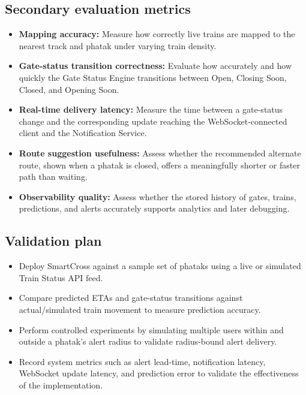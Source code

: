 \documentclass[11pt,a4paper]{article}
\begin{document}
\subsection{Secondary evaluation metrics}

\begin{itemize}
    \item \textbf{Mapping accuracy:} Measure how correctly live trains are mapped to the nearest track and phatak under varying train density.

    \item \textbf{Gate-status transition correctness:} Evaluate how accurately and how quickly the Gate Status Engine transitions between Open, Closing Soon, Closed, and Opening Soon.

    \item \textbf{Real-time delivery latency:} Measure the time between a gate-status change and the corresponding update reaching the WebSocket-connected client and the Notification Service.

    \item \textbf{Route suggestion usefulness:} Assess whether the recommended alternate route, shown when a phatak is closed, offers a meaningfully shorter or faster path than waiting.

    \item \textbf{Observability quality:} Assess whether the stored history of gates, trains, predictions, and alerts accurately supports analytics and later debugging.
\end{itemize}


\subsection{Validation plan}

\begin{itemize}
    \item Deploy SmartCross against a sample set of phataks using a live or simulated Train Status API feed.

    \item Compare predicted ETAs and gate-status transitions against actual/simulated train movement to measure prediction accuracy.

    \item Perform controlled experiments by simulating multiple users within and outside a phatak's alert radius to validate radius-bound alert delivery.

    \item Record system metrics such as alert lead-time, notification latency, WebSocket update latency, and prediction error to validate the effectiveness of the implementation.
\end{itemize}
\end{document}
